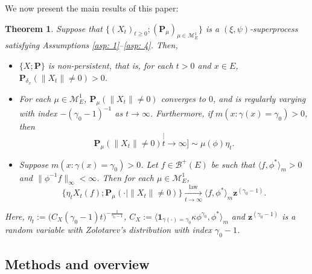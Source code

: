 \documentclass[12pt, a4paper]{amsart}
\newtheorem{thm}{Theorem}[section]
\theoremstyle{definition}
\numberwithin{equation}{section}
\begin{document}
	We now present the main results of this paper:

\begin{thm} \label{thm: main theorem}
	Suppose that $\{(X_t)_{t\geq 0}; (\mathbf P_\mu)_{\mu \in \mathcal M_E^1}\}$ is a $(\xi, \psi)$-superprocess satisfying Assumptions \ref{asp: 1}--\ref{asp: 4}. 
	Then,
\begin{itemize}
\item[(1)] 
	$\{X; \mathbf P\}$ is non-persistent, that is, for each $t > 0$ and $x\in E$, $\mathbf P_{\delta_x}( \| X_t\| \neq 0) > 0$.
\item[(2)] 
	For each $\mu \in \mathcal M^1_E$, $\mathbf P_{\mu}(\|X_t\| \neq 0)$ converges to $0$, and is regularly varying with index $-(\gamma_0-1)^{-1}$ as $t \to \infty$.
	Furthermore, if $m(x: \gamma (x)= \gamma_0)>0$, then
\begin{equation}
	\mathbf P_{\mu}(\|X_t\| \neq 0)
	\stackrel[t\to \infty]{}{\sim} \mu(\phi) \eta_t.
\end{equation}
\item[(3)] 
	Suppose $m( x:\gamma(x)=\gamma_0 )>0$.
	Let $f \in \mathscr B^+(E)$ be such that $\langle f, \phi^* \rangle_m > 0$ and $\| \phi^{-1}f \|_\infty < \infty$. Then for each $\mu \in \mathcal M_E^1$,
\begin{equation}
	\{\eta_t X_t(f) ; \mathbf P_{\mu}(\cdot |\|X_t\| \neq 0) \}
	\xrightarrow[t\to \infty]{\operatorname{law}} \langle f, \phi^*\rangle_m \mathbf z^{(\gamma_0 - 1)}.
\end{equation}
\end{itemize}
	Here, $\eta_t := \big( C_X(\gamma_0 - 1) t \big)^{- \frac {1} {\gamma_0 - 1} }$, $C_X := \langle \mathbf 1_{\gamma(\cdot) = \gamma_0} \kappa \phi^{\gamma_0}, \phi^* \rangle_m$ and $\mathbf z^{(\gamma_0 - 1)}$ is a random variable with Zolotarev's distribution with index $\gamma_0 - 1$.
\end{thm}

\subsection{Methods and overview}
	
\end{document}
